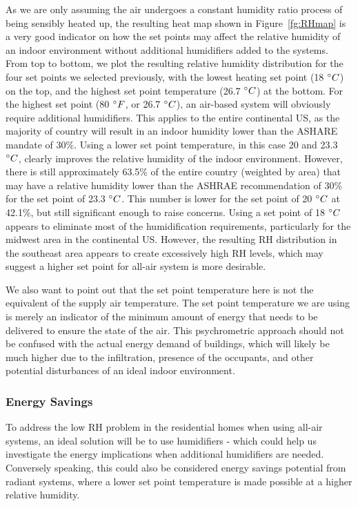 	As we are only assuming the air undergoes a constant humidity ratio process of being sensibly heated up, the resulting heat map shown in Figure~\ref{fg:RHmap} is a very good indicator on how the set points may affect the relative humidity of an indoor environment without additional humidifiers added to the systems. From top to bottom, we plot the resulting relative humidity distribution for the four set points we selected previously, with the lowest heating set point (18 $\degree C$) on the top, and the highest set point temperature (26.7 $\degree C$) at the bottom. For the highest set point (80 $\degree F$, or 26.7 $\degree C$), an air-based system will obviously require additional humidifiers. This applies to the entire continental US, as the majority of country will result in an indoor humidity lower than the ASHARE mandate of 30\%. Using a lower set point temperature, in this case 20 and 23.3 $\degree C$, clearly improves the relative humidity of the indoor environment. However, there is still approximately 63.5\% of the entire country (weighted by area) that may have a relative humidity lower than the ASHRAE recommendation of 30\% for the set point of 23.3 $\degree C$. This number is lower for the set point of 20 $\degree C$ at 42.1\%, but still significant enough to raise concerns. Using a set point of 18 $\degree C$ appears to eliminate most of the humidification requirements, particularly for the midwest area in the continental US. However, the resulting RH distribution in the southeast area appears to create excessively high RH levels, which may suggest a higher set point for all-air system is more desirable.

	We also want to point out that the set point temperature here is not the equivalent of the supply air temperature. The set point temperature we are using is merely an indicator of the minimum amount of energy that needs to be delivered to ensure the state of the air. This psychrometric approach should not be confused with the actual energy demand of buildings, which will likely be much higher due to the infiltration, presence of the occupants, and other potential disturbances of an ideal indoor environment. 

\subsubsection{Energy Savings}
	To address the low RH problem in the residential homes when using all-air systems, an ideal solution will be to use humidifiers - which could help us investigate the energy implications when additional humidifiers are needed. Conversely speaking, this could also be considered energy savings potential from radiant systems, where a lower set point temperature is made possible at a higher relative humidity. 

